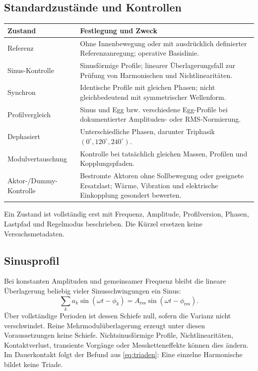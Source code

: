 \documentclass[11pt,a4paper]{article}
\begin{document}
\subsection{Standardzustände und Kontrollen}
\begin{longtable}{@{}L{.22\textwidth}L{.73\textwidth}@{}}
\toprule\textbf{Zustand}&\textbf{Festlegung und Zweck}\\\midrule\endhead
Referenz&Ohne Innenbewegung oder mit ausdrücklich definierter Referenzanregung; operative Basislinie.\\
Sinus-Kontrolle&Sinusförmige Profile; linearer Überlagerungsfall zur Prüfung von Harmonischen und Nichtlinearitäten.\\
Synchron&Identische Profile mit gleichen Phasen; nicht gleichbedeutend mit symmetrischer Wellenform.\\
Profilvergleich&Sinus und Egg bzw. verschiedene Egg-Profile bei dokumentierter Amplituden- oder RMS-Normierung.\\
Dephasiert&Unterschiedliche Phasen, darunter Triphasik $(0^\circ,120^\circ,240^\circ)$.\\
Modulvertauschung&Kontrolle bei tatsächlich gleichen Massen, Profilen und Kopplungspfaden.\\
Aktor-/Dummy-Kontrolle&Bestromte Aktoren ohne Sollbewegung oder geeignete Ersatzlast; Wärme, Vibration und elektrische Einkopplung gesondert bewerten.\\
\bottomrule\end{longtable}
Ein Zustand ist vollständig erst mit Frequenz, Amplitude, Profilversion, Phasen, Lastpfad und Regelmodus beschrieben. Die Kürzel ersetzen keine Versuchsmetadaten.

\subsection{Sinusprofil}\label{sec:sinus}
Bei konstanten Amplituden und gemeinsamer Frequenz bleibt die lineare Überlagerung beliebig vieler Sinusschwingungen ein Sinus:
\begin{equation}
\sum_k a_k\sin(\omega t-\phi_k)=A_{\mathrm{res}}\sin(\omega t-\phi_{\mathrm{res}}).
\end{equation}
Über vollständige Perioden ist dessen Schiefe null, sofern die Varianz nicht verschwindet. Reine Mehrmodulüberlagerung erzeugt unter diesen Voraussetzungen keine Schiefe. Nichtsinusförmige Profile, Nichtlinearitäten, Kontaktverlust, transiente Vorgänge oder Messketteneffekte können dies ändern. Im Dauerkontakt folgt der Befund aus \eqref{eq:triaden}: Eine einzelne Harmonische bildet keine Triade.
\end{document}
